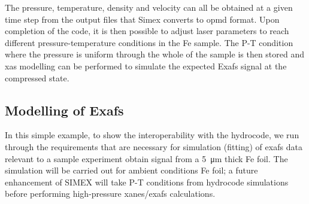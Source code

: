  The pressure, temperature, density and velocity can all be obtained at a given
 time step from the output files that Simex converts to opmd format. Upon
 completion of the code, it is then possible to adjust laser parameters to reach
 different pressure-temperature conditions in the Fe sample. The P-T condition
 where the pressure is uniform through the whole of the sample is then stored and
 \gls{xas} modelling can be performed to simulate the expected E\gls{xafs} signal at
 the compressed state.
%
 \begin{figure}
 \end{figure}
%
\subsection{Modelling of E\gls{xafs}}
In this simple example, to show the interoperability with the hydrocode,
we run through the requirements that are necessary for
simulation (fitting) of \gls{exafs} data relevant to a sample experiment obtain signal
from a \SI{5}{\micro\metre} thick Fe foil. The simulation will be carried out for
ambient conditions Fe foil; a future enhancement of SIMEX will take P-T
conditions from hydrocode simulations before performing high-pressure
\gls{xanes}/\gls{exafs} calculations.

